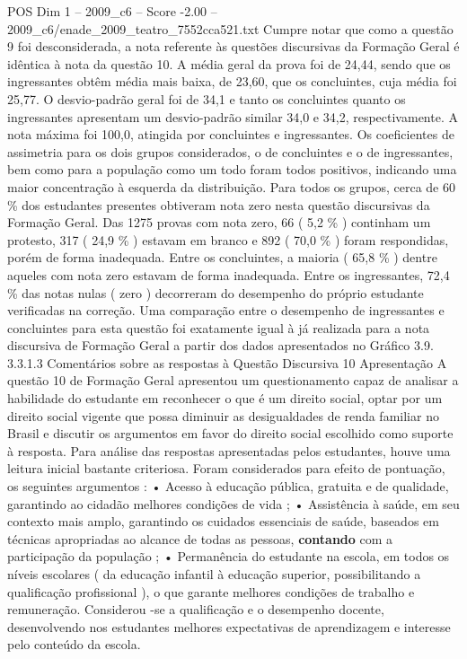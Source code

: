 \begin{textsample}{POS Dim 1 – 2009\_c6 – Score -2.00 – 2009\_c6/enade\_2009\_teatro\_7552cca521.txt}
Cumpre notar que como a questão 9 foi desconsiderada, a nota referente às questões discursivas da Formação Geral é idêntica à nota da questão 10.
A média geral da prova foi de 24,44, sendo que os ingressantes obtêm média mais baixa, de 23,60, que os concluintes, cuja média foi 25,77.
O desvio-padrão geral foi de 34,1 e tanto os concluintes quanto os ingressantes apresentam um desvio-padrão similar 34,0 e 34,2, respectivamente.
A nota máxima foi 100,0, atingida por concluintes e ingressantes.
Os coeficientes de assimetria para os dois grupos considerados, o de concluintes e o de ingressantes, bem como para a população como um todo foram todos positivos, indicando uma maior concentração à esquerda da distribuição.
Para todos os grupos, cerca de 60 \% dos estudantes presentes obtiveram nota zero nesta questão discursivas da Formação Geral.
Das 1275 provas com nota zero, 66 ( 5,2 \% ) continham um protesto, 317 ( 24,9 \% ) estavam em branco e 892 ( 70,0 \% ) foram respondidas, porém de forma inadequada.
Entre os concluintes, a maioria ( 65,8 \% ) dentre aqueles com nota zero estavam de forma inadequada.
Entre os ingressantes, 72,4 \% das notas nulas ( zero ) decorreram do desempenho do próprio estudante verificadas na correção.
Uma comparação entre o desempenho de ingressantes e concluintes para esta questão foi exatamente igual à já realizada para a nota discursiva de Formação Geral a partir dos dados apresentados no Gráfico 3.9. 3.3.1.3 Comentários sobre as respostas à Questão Discursiva 10 Apresentação A questão 10 de Formação Geral apresentou um questionamento capaz de analisar a habilidade do estudante em reconhecer o que é um direito social, optar por um direito social vigente que possa diminuir as desigualdades de renda familiar no Brasil e discutir os argumentos em favor do direito social escolhido como suporte à resposta.
Para análise das respostas apresentadas pelos estudantes, houve uma leitura inicial bastante criteriosa.
Foram considerados para efeito de pontuação, os seguintes argumentos : • Acesso à educação pública, gratuita e de qualidade, garantindo ao cidadão melhores condições de vida ; • Assistência à saúde, em seu contexto mais amplo, garantindo os cuidados essenciais de saúde, baseados em técnicas apropriadas ao alcance de todas as pessoas, \textbf{contando} com a participação da população ; • Permanência do estudante na escola, em todos os níveis escolares ( da educação infantil à educação superior, possibilitando a qualificação profissional ), o que garante melhores condições de trabalho e remuneração.
Considerou -se a qualificação e o desempenho docente, desenvolvendo nos estudantes melhores expectativas de aprendizagem e interesse pelo conteúdo da escola.

\end{textsample}
